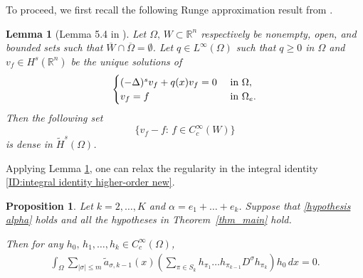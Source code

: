\documentclass [oneside,11pt] {amsart}
\numberwithin{equation}{section}
\newtheorem{prop}{Proposition}[section]
\newtheorem{lemma}{Lemma}[section]
\newcommand{\R}{\mathbb{R}}
\newcommand{\dx}{\,dx}
\newcommand{\LC}{\left(}
\newcommand{\RC}{\right)}
\begin{document}
To proceed, we first recall the following Runge approximation result from \cite[Lemma 5.4] {CMR21}.
\begin{lemma}[Lemma 5.4 in \cite {CMR21}]\label{lemma_runge1 new}
Let $\Omega,\, W \subset \R^n$ respectively be nonempty, open, and bounded sets such that $\overline{W}\cap \overline{\Omega} =\emptyset$. Let $q\in L^\infty(\Omega)$ such that $q\ge 0$ in $\Omega$ and $v_f\in H^s(\R^n)$ be the unique solutions of
\begin{equation*}
\begin{cases}
(-\Delta)^s v_f + q(x) v_f = 0 &\hbox{ in } \Omega,\\
v_f = f &\hbox{ in } \Omega_e.
\end{cases}    
\end{equation*}
Then the following set 
\[
\{v_f-f:\, f\in C^\infty_c(W)\}
\]
is dense in $\widetilde{H}^s(\Omega)$.
\end{lemma}


Applying Lemma \ref{lemma_runge1 new}, one can relax the regularity in the integral identity \eqref{ID:integral identity higher-order new}.

\begin{prop}\label{prop_density_second new}
Let $k=2,\ldots, K$ and  $\alpha=e_{1}+\ldots+e_{k}$. Suppose that \eqref{hypothesis alpha} holds and all the hypotheses in Theorem~\ref{thm_main} hold. 

Then for any $h_0,\, h_{1},\ldots, h_{k} \in C^\infty_c(\Omega)$,
\begin{align}\label{ID:integral identity higher-order}
\int_\Omega \sum_{|\sigma|\le m} \widetilde{a}_{\sigma,k-1}(x)\LC \sum_{\pi\in S_k} h_{\pi_1}\ldots h_{\pi_{k-1}}D^\sigma h_{\pi_k}\RC h_0 \dx = 0.
\end{align}
\end{prop}
\end{document}
